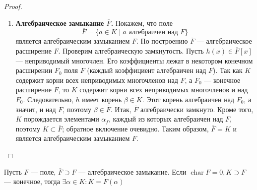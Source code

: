 \begin{proof}
\begin{enumerate}
        \item \textbf{Алгебраическое замыкание \(\overline{F}\).}  
        Покажем, что поле
        \[
        \overline{F} = \{ a \in K \mid a \text{ алгебраичен над } F \}
        \]
        является алгебраическим замыканием \(F\). По построению \(\overline{F}\) — алгебраическое расширение \(F\). Проверим алгебраическую замкнутость. Пусть \(h(x) \in \overline{F}[x]\) — неприводимый многочлен. Его коэффициенты лежат в некотором конечном расширении \(F_0\) поля \(F\) (каждый коэффициент алгебраичен над \(F\)). Так как \(K\) содержит корни всех неприводимых многочленов над \(F\), а \(F_0\) — конечное расширение \(F\), то \(K\) содержит корни всех неприводимых многочленов и над \(F_0\). Следовательно, \(h\) имеет корень \(\beta \in K\). Этот корень алгебраичен над \(F_0\), а значит, и над \(F\), поэтому \(\beta \in \overline{F}\). Итак, \(\overline{F}\) алгебраически замкнуто. Кроме того, \(K\) порождается элементами \(\alpha_f\), каждый из которых алгебраичен над \(F\), поэтому \(K \subset \overline{F}\); обратное включение очевидно. Таким образом, \(\overline{F} = K\) и является алгебраическим замыканием \(F\).
    \end{enumerate}
\end{proof}

\begin{theorem}
    Пусть \(F\) --- поле, \(\overline{F} \supset F\) --- алгебраическое замыкание. Если \(\operatorname{char} F = 0, K \supset F\) --- конечное, тогда \(\exists \alpha \in K: K = F(\alpha)\)
\end{theorem}


